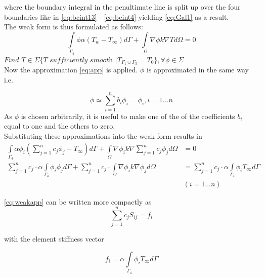 \documentclass[10pt,a4paper]{article}
\begin{document}
where the boundary integral in the penultimate line is split up over the four boundaries like in \eqref{eq:bcint13} - \eqref{eq:bcint4} yielding \eqref{eq:Gal1} as a result. \\

The weak form is thus formulated as follows:
\begin{equation*}
\underset{\Gamma_4}{\int}\phi \alpha \left(T_w -T_{\infty}\right)d\Gamma + \underset{\Omega}{\int}\nabla \phi k \nabla T d\Omega=0
\end{equation*}
$\textit{Find } T\in \Sigma\{\textit{T sufficiently smooth } \rvert T_{\Gamma_1 \cup \Gamma_3 }=T_0\}, \forall \phi \in \Sigma$\\

Now the approximation \eqref{eq:app} is applied. $\phi$ is approximated in the same way i.e.

\begin{equation*}
\phi \simeq \displaystyle\sum^n_{i=1} b_i \phi_i = \phi_i, i=1...n 
\end{equation*}
As $\phi$ is chosen arbitrarily, it is useful to make one of the of the coefficients $b_i$ equal to one and the others to zero.\\

Substituting these approximations into the weak form results in 
\begin{align}\label{eq:weakapp}
\underset{\Gamma_4}{\int} \alpha \phi_i  \left(\displaystyle\sum^n_{j=1} c_j \phi_j - T_{\infty}\right)d\Gamma + \underset{\Omega}{\int}\nabla \phi_i k \nabla \displaystyle\sum^n_{j=1} c_j \phi_j d\Omega &=0\nonumber\\
\displaystyle\sum^n_{j=1} c_j \cdot \alpha\underset{\Gamma_4}{\int}  \phi_i  \phi_jd\Gamma + \displaystyle\sum^n_{j=1} c_j \cdot \underset{\Omega}{\int}\nabla \phi_i k \nabla  \phi_j d\Omega &= \displaystyle\sum^n_{j=1} c_j\cdot \alpha\underset{\Gamma_4}{\int} \phi_i T_{\infty}d\Gamma \\
&(i=1...n)\nonumber
\end{align}

\eqref{eq:weakapp} can be written more compactly as 
\begin{equation*}
\displaystyle\sum^n_{j=1} c_j S_{ij} = f_i
\end{equation*}

with the element stiffness vector 

\begin{equation*}
f_i =\alpha\underset{\Gamma_4}{\int} \phi_i T_{\infty}d\Gamma 
\end{equation*}
\end{document}
